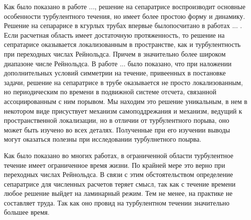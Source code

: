 Как было показано в работе ..., решение на сепаратрисе воспроизводит основные особенности турбулентного течения, но имеет более простою форму и динамику. Решение на сепарарисе в кгурлых трубах впервые былопосчитано в работах ... . Если расчетная область имеет достаточную протяженность, то решение на сепратарисе оказывается локализованным в пространстве, как и турбулентность при переходных числах Рейнольдса. Причем в значительно более широком диапазоне числе Рейнольдса. В работе ... было показано, что при наложении дополнительных условий симметрии на течение, привеенных в постановке задачи, решение на сепаратрисе в трубе оказывается не просто локализованным, но периодическим по времени в подвижной системе отсчета, связанной ассоциированным с ним порывом. Мы находим это решение уникальным, в нем в некотором виде присуствует механизм самоподдрежания и механизм, ведущий к пространственной локализации, но в отличии от турбулентного порыва, оно может быть изучено во всех деталях. Полученные при его изучении выводы могут оказаться полезны при исследовании турбулнетного поырва. 


Как было показано во многих работах, в ограниченной области турбулентное течение имеет ограниченное время жизни. По крайней мере это верно при переходных числах Рейнольдса. В связи с этим обстоятельством определение сепаратрисе для численных расчетов теряет смысл, так как с течение времени любое решение выйдет на ламинарный режим. Тем не менее, на практике не составляет труда. Так как оно провид на турбулентном течении значительно большее время. 




